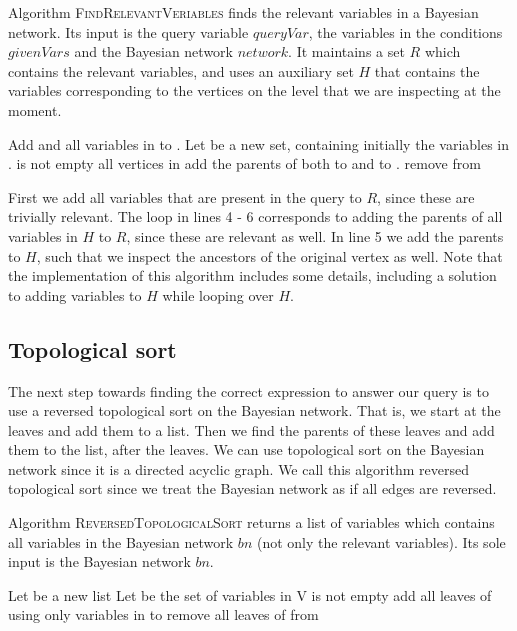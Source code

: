 \documentclass[10pt,a4paper]{article}
\begin{document}
Algorithm \textsc{FindRelevantVeriables} finds the relevant variables in a Bayesian network. Its input is the query variable $queryVar$, the variables in the conditions $givenVars$ and the Bayesian network $network$. It maintains a set $R$ which contains the relevant variables, and uses an auxiliary set $H$ that contains the variables corresponding to the vertices on the level that we are inspecting at the moment.

\begin{codebox}
\li Add  and all variables in  to .
\li Let  be a new set, containing initially the variables in .
\li \While {} is not empty 
\li	\Do
		\For all vertices  in  
\li \Do
			add the parents of  both to  and to .
\li			remove  from 
		\End
	\End
\li \Return {}
\end{codebox}

First we add all variables that are present in the query to $R$, since these are trivially relevant. The loop in lines 4 - 6 corresponds to adding the parents of all variables in $H$ to $R$, since these are relevant as well. In line 5 we add the parents to $H$, such that we inspect the ancestors of the original vertex as well. Note that the implementation of this algorithm includes some details, including a solution to adding variables to $H$ while looping over $H$.

\subsection{Topological sort}
The next step towards finding the correct expression to answer our query is to use a reversed topological sort on the Bayesian network. That is, we start at the leaves and add them to a list. Then we find the parents of these leaves and add them to the list, after the leaves. We can use topological sort on the Bayesian network since it is a directed acyclic graph. We call this algorithm reversed topological sort since we treat the Bayesian network as if all edges are reversed. 

Algorithm \textsc{ReversedTopologicalSort} returns a list of variables which contains all variables in the Bayesian network $bn$ (not only the relevant variables). Its sole input is the Bayesian network $bn$. 

\begin{codebox}
\li Let  be a new list
\li Let  be the set of variables in 
\li \While V is not empty \Do 
\li		add all leaves of  using only variables in  to 
\li		remove all leaves of  from 
	\End
\li \Return {}
\end{codebox}
\end{document}
